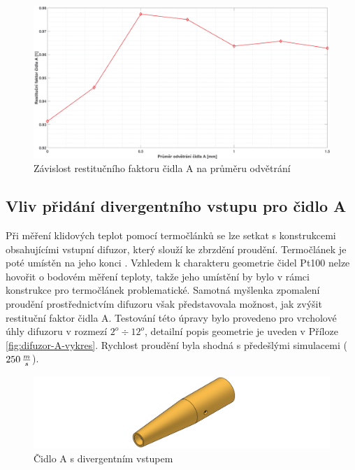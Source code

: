         \begin{figure}[ht!]
            \centering
            \includegraphics*[width=\textwidth]{400_SIMULACE_KONSTRUKCNICH_UPRAV/Grafy/07_prumer_odvetrani_A.eps}
            \caption{Závislost restitučního faktoru čidla A na průměru odvětrání}
            \label{fig:prumer-odvetrani-A}
        \end{figure}
    
    \newpage
    \subsection{Vliv přidání divergentního vstupu pro čidlo A}
        Při měření klidových teplot pomocí termočlánků se lze setkat s konstrukcemi obsahujícími vstupní difuzor, který slouží ke zbrzdění proudění. Termočlánek je poté umístěn na jeho konci \cite{Shapiro1954}. Vzhledem k charakteru geometrie čidel Pt100 nelze hovořit o bodovém měření teploty, takže jeho umístění by bylo v rámci konstrukce pro termočlánek problematické. Samotná myšlenka zpomalení proudění prostřednictvím difuzoru však představovala možnost, jak zvýšit restituční faktor čidla A. Testování této úpravy bylo provedeno pro vrcholové úhly difuzoru v rozmezí $2^o \div 12^o$, detailní popis geometrie je uveden v Příloze \ref{fig:difuzor-A-vykres}. Rychlost proudění byla shodná s předešlými simulacemi ($250 \, \frac{m}{s}$).
        
        \begin{figure}[ht!]
            \centering
            \includegraphics[width=\textwidth]{400_SIMULACE_KONSTRUKCNICH_UPRAV/Vykresy_rendery/Difuzor_A.png}
            \caption{Čidlo A s divergentním vstupem}
            \label{fig:difuzor-A}
        \end{figure}

